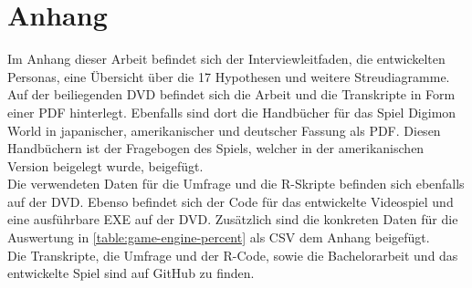 \appendix
\section{Anhang}
Im Anhang dieser Arbeit befindet sich der Interviewleitfaden, die entwickelten Personas, eine Übersicht über die 17 Hypothesen und weitere Streudiagramme.\\

Auf der beiliegenden DVD befindet sich die Arbeit und die Transkripte in Form einer PDF hinterlegt. Ebenfalls sind dort die Handbücher für das Spiel Digimon World in japanischer, amerikanischer und deutscher Fassung als PDF. Diesen Handbüchern ist der Fragebogen des Spiels, welcher in der amerikanischen Version beigelegt wurde, beigefügt.\\

Die verwendeten Daten für die Umfrage und die R-Skripte befinden sich ebenfalls auf der DVD. Ebenso befindet sich der Code für das entwickelte Videospiel und eine ausführbare EXE auf der DVD. Zusätzlich sind die konkreten Daten für die Auswertung in \autoref{table:game-engine-percent} als \ac{CSV} dem Anhang beigefügt.  \\

Die Transkripte, die Umfrage und der R-Code, sowie die Bachelorarbeit und das entwickelte Spiel sind auf GitHub zu finden\cite{github-transcripts}\cite{github-survey}\cite{github-bachelor-thesis}\cite{github-evo-world}.
